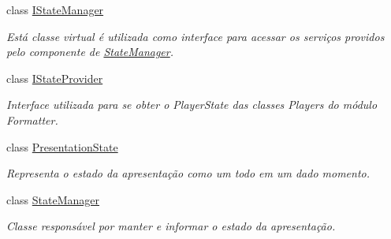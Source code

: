 \begin{DoxyCompactItemize}
class \hyperlink{classbr_1_1ufscar_1_1lince_1_1ginga_1_1wac_1_1state_1_1IStateManager}{IStateManager}
\begin{DoxyCompactList}\small\item\em Está classe virtual é utilizada como interface para acessar os serviços providos pelo componente de \hyperlink{classbr_1_1ufscar_1_1lince_1_1ginga_1_1wac_1_1state_1_1StateManager}{StateManager}. \item\end{DoxyCompactList}\item 
class \hyperlink{classbr_1_1ufscar_1_1lince_1_1ginga_1_1wac_1_1state_1_1IStateProvider}{IStateProvider}
\begin{DoxyCompactList}\small\item\em Interface utilizada para se obter o PlayerState das classes Players do módulo Formatter. \item\end{DoxyCompactList}\item 
class \hyperlink{classbr_1_1ufscar_1_1lince_1_1ginga_1_1wac_1_1state_1_1PresentationState}{PresentationState}
\begin{DoxyCompactList}\small\item\em Representa o estado da apresentação como um todo em um dado momento. \item\end{DoxyCompactList}\item 
class \hyperlink{classbr_1_1ufscar_1_1lince_1_1ginga_1_1wac_1_1state_1_1StateManager}{StateManager}
\begin{DoxyCompactList}\small\item\em Classe responsável por manter e informar o estado da apresentação. \item\end{DoxyCompactList}\end{DoxyCompactItemize}
